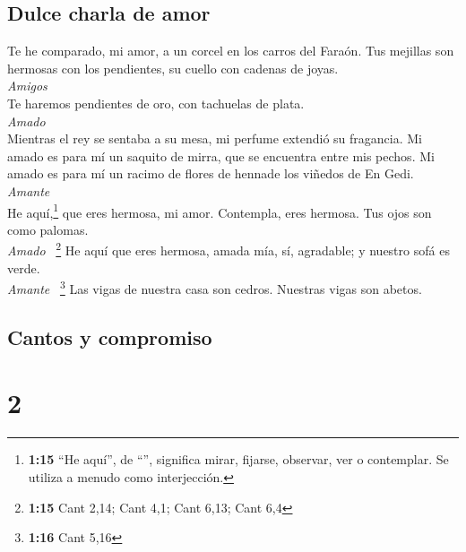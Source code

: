 \hypertarget{dulce-charla-de-amor}{%
\subsection{Dulce charla de amor}\label{dulce-charla-de-amor}}

 Te he comparado, mi amor, a un corcel en los carros del
Faraón.  Tus mejillas son hermosas con los pendientes, su
cuello con cadenas de joyas.\\
\emph{Amigos}\\
 Te haremos pendientes de oro, con tachuelas de plata.\\
\emph{Amado}\\
 Mientras el rey se sentaba a su mesa, mi perfume
extendió su fragancia.  Mi amado es para mí un saquito de
mirra, que se encuentra entre mis pechos.  Mi amado es
para mí un racimo de flores de hennade los viñedos de En Gedi.\\
\emph{Amante}\\
 He aquí,\footnote{\textbf{1:15} ``He aquí'', de
  ``'', significa mirar, fijarse, observar, ver o
  contemplar. Se utiliza a menudo como interjección.} que eres hermosa,
mi amor. Contempla, eres hermosa. Tus ojos son como palomas.\\
\emph{Amado} ~\footnote{\textbf{1:15} Cant 2,14; Cant 4,1; Cant 6,13;
  Cant 6,4}  He aquí que eres hermosa, amada mía, sí,
agradable; y nuestro sofá es verde.\\
\emph{Amante} ~\footnote{\textbf{1:16} Cant 5,16}  Las
vigas de nuestra casa son cedros. Nuestras vigas son abetos.

\hypertarget{cantos-y-compromiso}{%
\subsection{Cantos y compromiso}\label{cantos-y-compromiso}}

\hypertarget{section-1}{%
\section{2}\label{section-1}}

